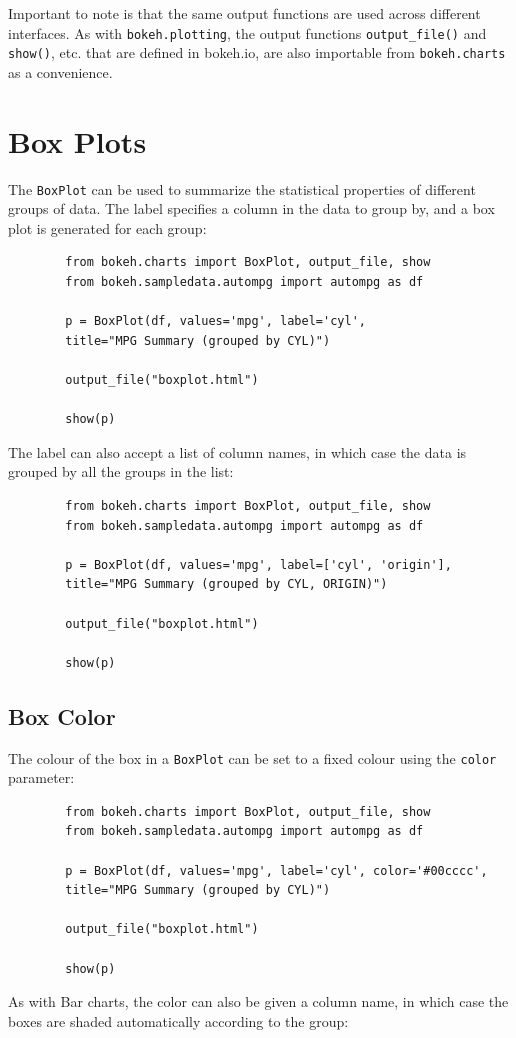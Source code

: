 \documentclass[a4paper,12pt]{article}
\begin{document}
\newpage

Important to note is that the same output functions are used across different interfaces. As with \texttt{bokeh.plotting}, the output functions \texttt{output\_file()} and \texttt{show()}, etc. that are defined in bokeh.io, are also importable from \texttt{bokeh.charts} as a convenience.

\newpage
\section*{Box Plots}
The \texttt{BoxPlot} can be used to summarize the statistical properties of different groups of data. The label specifies a column in the data to group by, and a box plot is generated for each group:
{
	\large
	\begin{framed}
		\begin{verbatim}
		from bokeh.charts import BoxPlot, output_file, show
		from bokeh.sampledata.autompg import autompg as df
		
		p = BoxPlot(df, values='mpg', label='cyl',
		title="MPG Summary (grouped by CYL)")
		
		output_file("boxplot.html")
		
		show(p)
		\end{verbatim}
	\end{framed}
}
\newpage
\noindent The label can also accept a list of column names, in which case the data is grouped by all the groups in the list:
{
	\large
	\begin{framed}
		\begin{verbatim}
		from bokeh.charts import BoxPlot, output_file, show
		from bokeh.sampledata.autompg import autompg as df
		
		p = BoxPlot(df, values='mpg', label=['cyl', 'origin'],
		title="MPG Summary (grouped by CYL, ORIGIN)")
		
		output_file("boxplot.html")
		
		show(p)
		\end{verbatim}
	\end{framed}
}
\newpage
\subsection*{Box Color}
The colour of the box in a \texttt{BoxPlot} can be set to a fixed colour using the \texttt{color} parameter:
{
	\large
	\begin{framed}
		\begin{verbatim}
		from bokeh.charts import BoxPlot, output_file, show
		from bokeh.sampledata.autompg import autompg as df
		
		p = BoxPlot(df, values='mpg', label='cyl', color='#00cccc',
		title="MPG Summary (grouped by CYL)")
		
		output_file("boxplot.html")
		
		show(p)
		\end{verbatim}
	\end{framed}
}
\newpage
\noindent As with Bar charts, the color can also be given a column name, in which case the boxes are shaded automatically according to the group:\\
\end{document}

